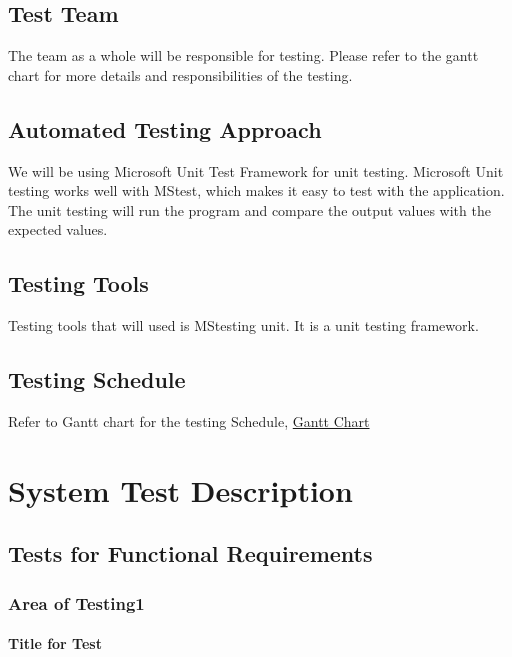 \documentclass[12pt, titlepage]{article}
\begin{document}
\subsection{Test Team}
The team as a whole will be responsible for testing. Please refer to the gantt chart for more details and responsibilities of the testing.

\subsection{Automated Testing Approach}
We will be using Microsoft Unit Test Framework for unit testing. Microsoft Unit testing works well with MStest, which makes it easy to test with the application. The unit testing will run the program and compare the output values with the expected values.
\subsection{Testing Tools}
Testing tools that will used is MStesting unit. It is a unit testing framework. %
\subsection{Testing Schedule}
Refer to Gantt chart for the testing Schedule, \href{run:../../ProjectSchedule/Gantt Chart.gan}{Gantt Chart} 

\section{System Test Description}
	
\subsection{Tests for Functional Requirements} \label{section:31}

\subsubsection{Area of Testing1}
		
\paragraph{Title for Test}
\end{document}
